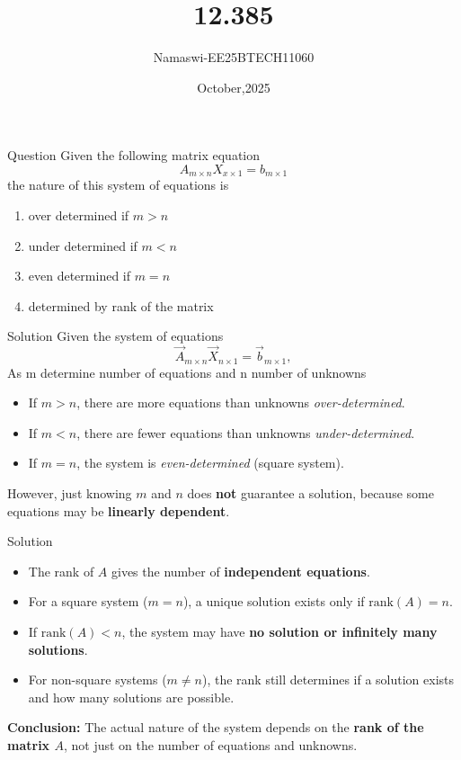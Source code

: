 \documentclass{beamer}
\begin{document}
\title 
{12.385}
\date{October,2025}


\author 
{Namaswi-EE25BTECH11060}
\frame{\titlepage}
\begin{frame}{Question}
Given the following matrix equation 
 \[
A_{m \times n} X_{x \times 1} = b_{m \times 1}
\]  the nature of this system of equations is \\
\begin{multicols}{2}
    \begin{enumerate}
\item  over determined if $m>n$
 \item  under determined if $m<n$
 \item  even determined if $m=n$
 \item  determined by rank of the matrix 
    \end{enumerate}
\end{multicols}
\end{frame}
\begin{frame}{Solution}
    Given the system of equations 
\[
\Vec{A}_{m \times n} \Vec{X}_{n \times 1} = \Vec{b}_{m \times 1},
\] 
As m determine number of equations and n number of unknowns\\ 
\begin{itemize}
    \item If $m > n$, there are more equations than unknowns   \textit{over-determined}.
    \item If $m < n$, there are fewer equations than unknowns   \textit{under-determined}.
    \item If $m = n$, the system is \textit{even-determined} (square system).
    \end{itemize}
However, just knowing $m$ and $n$ does \textbf{not} guarantee a solution, because some equations may be \textbf{linearly dependent}.
\end{frame}
\begin{frame}{Solution}
    \begin{itemize}
    \item The rank of $A$ gives the number of \textbf{independent equations}.
    \item For a square system ($m=n$), a unique solution exists only if $\text{rank}(A) = n$.
    \item If $\text{rank}(A) < n$, the system may have \textbf{no solution or infinitely many solutions}.
    \item For non-square systems ($m \neq n$), the rank still determines if a solution exists and how many solutions are possible.
\end{itemize}
\textbf{Conclusion:}  
The actual nature of the system depends on the \textbf{rank of the matrix $A$}, not just on the number of equations and unknowns.  
\end{frame}
\end{document}
